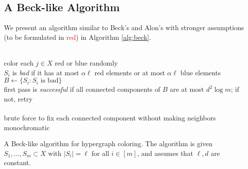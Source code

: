 \documentclass[letterpaper, reqno,11pt]{article}
\begin{document}
\subsection{A Beck-like Algorithm}

We present an algorithm similar to Beck's and Alon's with stronger assumptions (to be formulated in \textcolor{red}{red}) in Algorithm \ref{alg:beck}.

\begin{algorithm}
   \\
  color each $j \in X$ red or blue randomly \\
  $S_i$ is \emph{bad} if it has at most $\alpha \ell$ red elements or at most $\alpha \ell$ blue elements \\
  $B \leftarrow \{ S_i : \text{$S_i$ is bad} \}$ \\
  first pass is \emph{successful} if all connected components of $B$ are at most $d^2 \log m$; if not, retry \CommentSty{\textcolor{ForestGreen}{(an edge between $A_i$ and $A_j$ if $A_i \cap A_j \neq \emptyset$)}} \\
   \\
  brute force to fix each connected component without making neighbors monochromatic
  \caption{A Beck-like algorithm for hypergraph coloring. The algorithm is given $S_1, \ldots, S_m \subset X$ with $|S_i| = \ell$ for all $i \in [m]$, and assumes that $\ell, d$ are constant.}
  \label{alg:beck}
\end{algorithm}
\end{document}
